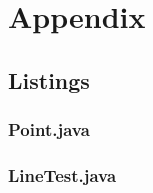 \chapter{Appendix}

\section{Listings}

\subsection{Point.java}


\newpage

\subsection{LineTest.java}
